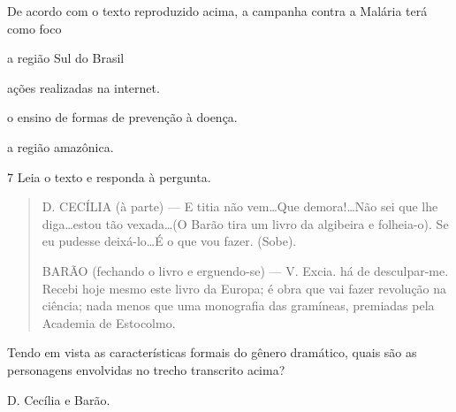 De acordo com o texto reproduzido acima, a campanha contra a Malária
terá como foco

\begin{escolha}
  \item a região Sul do Brasil

  \item ações realizadas na internet.

  \item o ensino de formas de prevenção à doença.

  \item a região amazônica.


\num{7} Leia o texto e responda à pergunta.

\begin{quote}
D. CECÍLIA (à parte) --- E titia não vem\ldots Que demora!\ldots Não sei
que lhe diga\ldots estou tão vexada\ldots (O Barão tira um livro da algibeira
e folheia-o). Se eu pudesse deixá-lo\ldots É o que vou fazer. (Sobe).

BARÃO (fechando o livro e erguendo-se) --- V. Excia. há de desculpar-me.
Recebi hoje mesmo este livro da Europa; é obra que vai fazer revolução na
ciência; nada menos que uma monografia das gramíneas, premiadas pela 
Academia de Estocolmo.
\end{quote}


Tendo em vista as características formais do gênero dramático, quais são
as personagens envolvidas no trecho transcrito acima?

\begin{escolha}

  \item D. Cecília e Barão.


\end{escolha}
\end{escolha}
